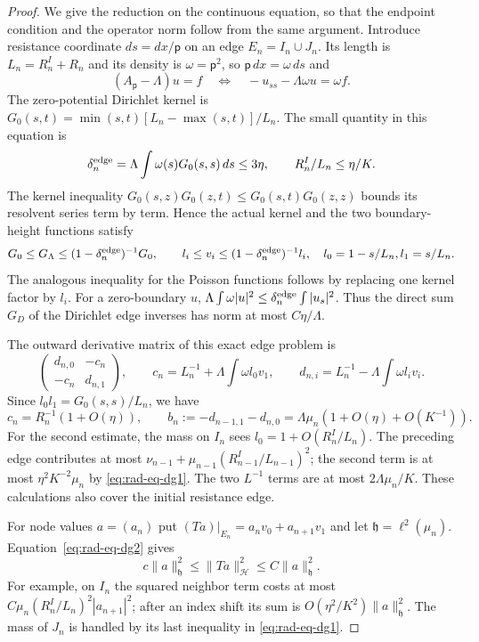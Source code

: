 \begin{proof}
We give the reduction on the continuous equation, so that the endpoint
condition and the operator norm follow from the same argument.
Introduce resistance coordinate $ds=dx/\mathsf p$ on an edge
$E_n=I_n\cup J_n$.  Its length is $L_n=R_n^I+R_n$ and its density is
$\omega=\mathsf p^2$, so $\mathsf p\,dx=\omega\,ds$ and
\[
 (A_{\mathsf p}-\Lambda)u=f
 \quad\Longleftrightarrow\quad -u_{ss}-\Lambda\omega u=\omega f.
\]
The zero-potential Dirichlet kernel is
$G_0(s,t)=\min(s,t)[L_n-\max(s,t)]/L_n$.
The small quantity in this equation is
\[
 \delta_n^{\rm edge}=\Lambda\int\omega(s)G_0(s,s)\,ds\le3\eta,
 \qquad R_n^I/L_n\le\eta/K.
\]
The kernel inequality
$G_0(s,z)G_0(z,t)\le G_0(s,t)G_0(z,z)$ bounds its resolvent series
term by term.  Hence the actual kernel and the two boundary-height
functions satisfy
\begin{equation}\label{eq:rad-eq-dg2}
 G_0\le G_\Lambda\le(1-\delta_n^{\rm edge})^{-1}G_0,
 \qquad l_i\le v_i\le(1-\delta_n^{\rm edge})^{-1}l_i,
 \quad l_0=1-s/L_n, l_1=s/L_n.
\end{equation}
The analogous inequality for the Poisson functions follows by replacing
one kernel factor by $l_i$.  For a zero-boundary $u$,
$\Lambda\int\omega|u|^2\le\delta_n^{\rm edge}\int|u_s|^2$.
Thus the direct sum $G_D$ of the Dirichlet edge inverses has norm
at most $C\eta/\Lambda$.

The outward derivative matrix of this exact edge problem is
\[
 \begin{pmatrix}d_{n,0}&-c_n\\-c_n&d_{n,1}\end{pmatrix},\qquad
 c_n=L_n^{-1}+\Lambda\int\omega l_0v_1,\qquad
 d_{n,i}=L_n^{-1}-\Lambda\int\omega l_iv_i.
\]
Since $l_0l_1=G_0(s,s)/L_n$, we have
\begin{equation}\label{eq:rad-eq-dg3}
 c_n=R_n^{-1}(1+O(\eta)),\qquad
 b_n:=-d_{n-1,1}-d_{n,0}
       =\Lambda\mu_n(1+O(\eta)+O(K^{-1})).
\end{equation}
For the second estimate, the mass on $I_n$ sees
$l_0=1+O(R_n^I/L_n)$.  The preceding edge contributes at most
$\nu_{n-1}+\mu_{n-1}(R_{n-1}^I/L_{n-1})^2$; the second term is
at most $\eta^2K^{-2}\mu_n$ by \eqref{eq:rad-eq-dg1}.
The two $L^{-1}$ terms are at most $2\Lambda\mu_n/K$.
These calculations also cover the initial resistance edge.

For node values $a=(a_n)$ put
$(Ta)|_{E_n}=a_nv_0+a_{n+1}v_1$ and let
$\mathfrak h=\ell^2(\mu_n)$.  Equation~\eqref{eq:rad-eq-dg2} gives
\begin{equation}\label{eq:rad-eq-dj1}
 c\|a\|_{\mathfrak h}^2\le\|Ta\|_{\mathcal H}^2
                         \le C\|a\|_{\mathfrak h}^2.
\end{equation}
For example, on $I_n$ the squared neighbor term costs at most
$C\mu_n(R_n^I/L_n)^2|a_{n+1}|^2$; after an index shift its sum is
$O(\eta^2/K^2)\|a\|_{\mathfrak h}^2$.  The mass of $J_n$ is handled
by its last inequality in \eqref{eq:rad-eq-dg1}.


\end{proof}
